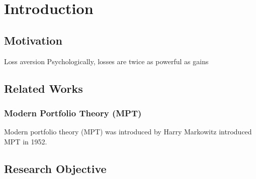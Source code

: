 \chapter{Introduction}

\section {Motivation}
Loss aversion Psychologically, losses are twice as powerful as gains \cite{Tversky1992}

\section {Related Works}
\subsection{Modern Portfolio Theory (MPT)}
Modern portfolio theory (MPT) was introduced by Harry Markowitz introduced MPT in 1952\cite{10.2307/2975974}. 


\section {Research Objective}

\label{c:intro}

